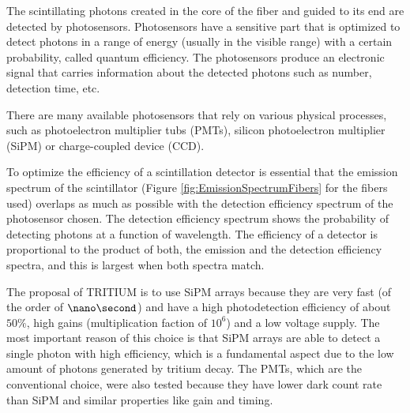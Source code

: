 The scintillating photons created in the core of the fiber and guided to its end are detected by photosensors. Photosensors have a sensitive part that is optimized to detect photons in a range of energy (usually in the visible range) with a certain probability, called quantum efficiency. The photosensors produce an electronic signal that carries information about the detected photons such as number, detection time, etc.

There are many available photosensors that rely on various physical processes, such as photoelectron multiplier tubs (PMTs), silicon photoelectron multiplier (SiPM) or charge-coupled device (CCD).  %

To optimize the efficiency of a scintillation detector is essential that the emission spectrum of the scintillator (Figure \ref{fig:EmissionSpectrumFibers} for the fibers used) overlaps as much as possible with the detection efficiency spectrum of the photosensor chosen. The detection efficiency spectrum shows the probability of detecting photons at a function of wavelength. The efficiency of a detector is proportional to the product of both, the emission and the detection efficiency spectra, and this is largest when both spectra match.

The proposal of TRITIUM is to use SiPM arrays because they are very fast (of the order of $\nano\second$) and have a high photodetection efficiency of about $50\%$, high gains (multiplication faction of $10^{6}$) and a low voltage supply. The most important reason of this choice is that SiPM arrays are able to detect a single photon with high efficiency, which is a fundamental aspect due to the low amount of photons generated by tritium decay. The PMTs, which are the conventional choice, were also tested because they have lower dark count rate than SiPM and similar properties like gain and timing.




